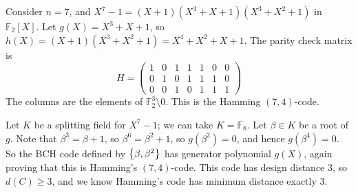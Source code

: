 \begin{example}
    Consider \( n = 7 \), and \( X^7 - 1 = (X + 1)(X^3 + X + 1)(X^3 + X^2 + 1) \) in \( \mathbb F_2[X] \).
    Let \( g(X) = X^3 + X + 1 \), so \( h(X) = (X + 1)(X^3 + X^2 + 1) = X^4 + X^2 + X + 1 \).
    The parity check matrix is
    \[ H = \begin{pmatrix}
        1 & 0 & 1 & 1 & 1 & 0 & 0 \\
        0 & 1 & 0 & 1 & 1 & 1 & 0 \\
        0 & 0 & 1 & 0 & 1 & 1 & 1
    \end{pmatrix} \]
    The columns are the elements of \( \mathbb F_2^3 \setminus \qty{0} \).
    This is the Hamming \( (7,4) \)-code.

    Let \( K \) be a splitting field for \( X^7 - 1 \); we can take \( K = \mathbb F_8 \).
    Let \( \beta \in K \) be a root of \( g \).
    Note that \( \beta^3 = \beta + 1 \), so \( \beta^6 = \beta^2 + 1 \), so \( g(\beta^2) = 0 \), and hence \( g(\beta^4) = 0 \).
    So the BCH code defined by \( \qty{\beta, \beta^2} \) has generator polynomial \( g(X) \), again proving that this is Hamming's \( (7,4) \)-code.
    This code has design distance \( 3 \), so \( d(C) \geq 3 \), and we know Hamming's code has minimum distance exactly 3.
\end{example}

